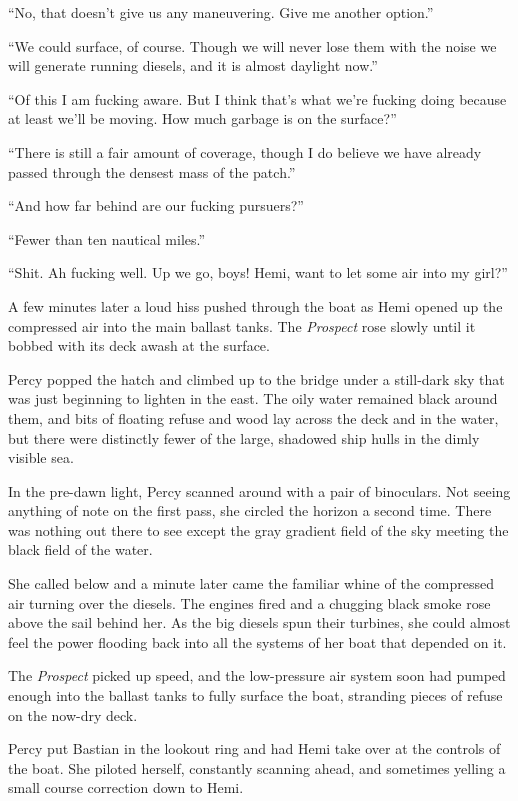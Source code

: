 \documentclass[
]{scrbook}
\begin{document}
``No, that doesn't give us any maneuvering. Give me another option.''

``We could surface, of course. Though we will never lose them with the
noise we will generate running diesels, and it is almost daylight now.''

``Of this I am fucking aware. But I think that's what we're fucking
doing because at least we'll be moving. How much garbage is on the
surface?''

``There is still a fair amount of coverage, though I do believe we have
already passed through the densest mass of the patch.''

``And how far behind are our fucking pursuers?''

``Fewer than ten nautical miles.''

``Shit. Ah fucking well. Up we go, boys! Hemi, want to let some air into
my girl?''

A few minutes later a loud hiss pushed through the boat as Hemi opened
up the compressed air into the main ballast tanks. The \emph{Prospect}
rose slowly until it bobbed with its deck awash at the surface.

Percy popped the hatch and climbed up to the bridge under a still-dark
sky that was just beginning to lighten in the east. The oily water
remained black around them, and bits of floating refuse and wood lay
across the deck and in the water, but there were distinctly fewer of the
large, shadowed ship hulls in the dimly visible sea.

In the pre-dawn light, Percy scanned around with a pair of binoculars.
Not seeing anything of note on the first pass, she circled the horizon a
second time. There was nothing out there to see except the gray gradient
field of the sky meeting the black field of the water.

She called below and a minute later came the familiar whine of the
compressed air turning over the diesels. The engines fired and a
chugging black smoke rose above the sail behind her. As the big diesels
spun their turbines, she could almost feel the power flooding back into
all the systems of her boat that depended on it.

The \emph{Prospect} picked up speed, and the low-pressure air system
soon had pumped enough into the ballast tanks to fully surface the boat,
stranding pieces of refuse on the now-dry deck.

Percy put Bastian in the lookout ring and had Hemi take over at the
controls of the boat. She piloted herself, constantly scanning ahead,
and sometimes yelling a small course correction down to Hemi.
\end{document}

